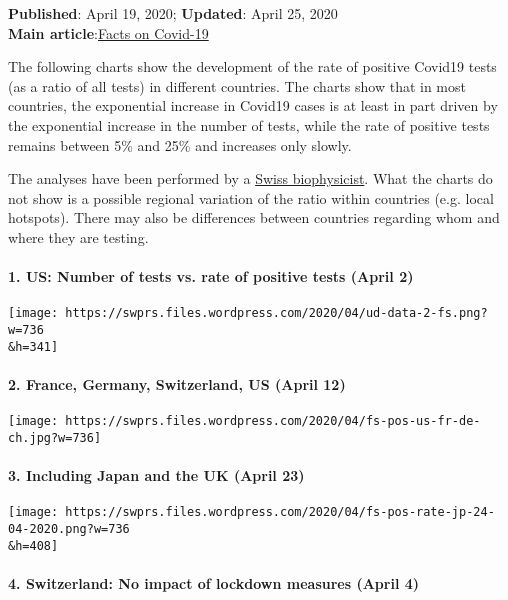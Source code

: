 \textbf{Published}: April 19, 2020; \textbf{Updated}: April 25, 2020\\
\textbf{Main
article}:\href{https://swprs.org/a-swiss-doctor-on-covid-19/}{Facts on
Covid-19}

The following charts show the development of the rate of positive
Covid19 tests (as a ratio of all tests) in different countries. The
charts show that in most countries, the exponential increase in Covid19
cases is at least in part driven by the exponential increase in the
number of tests, while the rate of positive tests remains between 5\%
and 25\% and increases only slowly.

The analyses have been performed by a
\href{https://twitter.com/FScholkmann}{Swiss biophysicist}. What the
charts do not show is a possible regional variation of the ratio within
countries (e.g. local hotspots). There may also be differences between
countries regarding whom and where they are testing.

\hypertarget{1-us-number-of-tests-vs-rate-of-positive-tests-april-2}{%
\paragraph{1. US: Number of tests vs. rate of positive tests (April
2)}\label{1-us-number-of-tests-vs-rate-of-positive-tests-april-2}}

\texttt{[image: https://swprs.files.wordpress.com/2020/04/ud-data-2-fs.png?w=736\\\&h=341]}

\hypertarget{2-france-germany-switzerland-us-april-12}{%
\paragraph{2. France, Germany, Switzerland, US (April
12)}\label{2-france-germany-switzerland-us-april-12}}

\texttt{[image: https://swprs.files.wordpress.com/2020/04/fs-pos-us-fr-de-ch.jpg?w=736]}

\hypertarget{3-including-japan-and-the-uk-april-23}{%
\paragraph{3. Including Japan and the UK (April
23)}\label{3-including-japan-and-the-uk-april-23}}

\texttt{[image: https://swprs.files.wordpress.com/2020/04/fs-pos-rate-jp-24-04-2020.png?w=736\\\&h=408]}

\hypertarget{4-switzerland-no-impact-of-lockdown-measures-april-4}{%
\paragraph{4. Switzerland: No impact of lockdown measures (April
4)}\label{4-switzerland-no-impact-of-lockdown-measures-april-4}}

